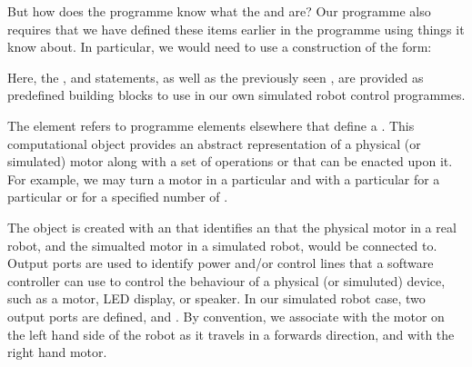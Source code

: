 \documentclass[letterpaper,10pt,english]{sphinxmanual}
\begin{document}
But how does the programme know what the  and  are? Our programme also requires that we have defined these items earlier in the programme using things it  know about. In particular, we would need to use a construction of the form:

\begin{sphinxVerbatim}[commandchars=\\\{\}]
  
  
\end{sphinxVerbatim}

Here, the ,  and  statements, as well as the previously seen , are provided as predefined building blocks to use in our own simulated robot control programmes.

The  element refers to programme elements elsewhere that define a  . This computational object provides an abstract representation of a physical (or simulated) motor along with a set of operations or  that can be enacted upon it. For example, we may turn a motor  in a particular  and with a particular  for a particular  or for a specified number of .

The  object is created with an  that identifies an  that the physical motor in a real robot, and the simualted motor in a simulated robot, would be connected to. Output ports are used to identify power and/or control lines that a software controller can use to control the behaviour of a physical (or simuluted) device, such as a motor, LED display, or speaker. In our simulated robot case, two output ports are defined,  and . By convention,
we associate  with the motor on the left hand side of the robot as it travels in a forwards direction, and  with the right hand motor.
\end{document}
